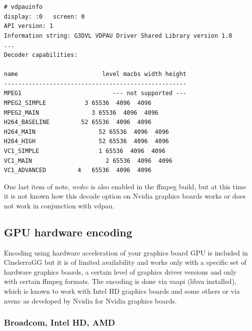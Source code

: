\begin{lstlisting}[numbers=none]
# vdpauinfo
display: :0   screen: 0
API version: 1
Information string: G3DVL VDPAU Driver Shared Library version 1.0
...
Decoder capabilities:

name                        level macbs width height
----------------------------------------------------
MPEG1                          --- not supported ---                                                                      
MPEG2_SIMPLE           3 65536  4096  4096                                                                       
MPEG2_MAIN               3 65536  4096  4096                                                                       
H264_BASELINE         52 65536  4096  4096                                                                       
H264_MAIN                  52 65536  4096  4096                                                                       
H264_HIGH                  52 65536  4096  4096                                                                       
VC1_SIMPLE                 1 65536  4096  4096                                                                       
VC1_MAIN                     2 65536  4096  4096                                                                       
VC1_ADVANCED         4   65536  4096  4096 
\end{lstlisting}

One last item of note, \textit{nvdec} is also enabled in the ffmpeg build, but at this time it is not known how this decode option on Nvidia graphics boards works or does not work in conjunction with vdpau.

\subsection{GPU hardware encoding}%
\label{sub:gpu_hardware_encoding}

Encoding using hardware acceleration of your graphics board GPU is included in CinelerraGG but it is of limited availability and works only with a specific set of hardware graphics boards, a certain level of graphics driver versions and only with certain ffmpeg formats.  The encoding is done via vaapi (libva installed), which is known to work with Intel HD graphics boards and some others or via nvenc as developed by Nvidia for Nvidia graphics boards.

\subsubsection*{Broadcom, Intel HD, AMD}%
\label{ssub:broadcom_intel_amd}

